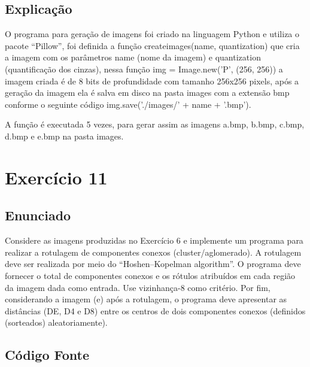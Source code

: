 \documentclass{article}
\begin{document}
\subsection{Explicação}

O programa para geração de imagens foi criado na linguagem Python e utiliza o pacote “Pillow”, foi definida a função {\ttfamily create\textunderscore images(name, quantization)} que cria a imagem com os parâmetros name (nome da imagem) e quantization (quantificação dos cinzas), nessa função {\ttfamily img = Image.new('P', (256, 256))} a imagem criada é de 8 bits de profundidade com tamanho 256x256 pixels, após a geração da imagem ela é salva em disco na pasta images com a extensão bmp conforme o seguinte código  {\ttfamily  img.save('./images/' + name + '.bmp')}.

A função é executada 5 vezes, para gerar assim as imagens a.bmp, b.bmp, c.bmp, d.bmp e e.bmp na pasta images.  


\section{Exercício 11}

\subsection{Enunciado}

Considere as imagens produzidas no Exercício 6 e implemente um programa para realizar a rotulagem de componentes conexos (cluster/aglomerado). A rotulagem deve ser realizada por meio do “Hoshen–Kopelman algorithm”. O programa deve fornecer o total de componentes conexos e os rótulos atribuídos em cada região da imagem dada como entrada. Use vizinhança-8 como critério. Por fim, considerando a imagem (e) após a rotulagem, o programa deve apresentar as distâncias (DE, D4 e D8) entre os centros de dois componentes conexos (definidos (sorteados) aleatoriamente).

\subsection{Código Fonte}
\end{document}
